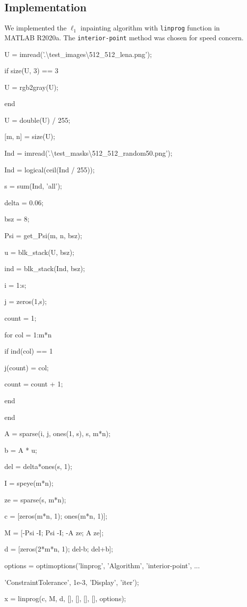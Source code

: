 \documentclass[]{article}
\newenvironment{Shaded}{}{}
\newcommand{\CommentTok}[1]{\textcolor[rgb]{0.38,0.63,0.69}{\textit{#1}}}
\newcommand{\FloatTok}[1]{\textcolor[rgb]{0.25,0.63,0.44}{#1}}
\newcommand{\NormalTok}[1]{#1}
\newcommand{\StringTok}[1]{\textcolor[rgb]{0.25,0.44,0.63}{#1}}
\begin{document}
\hypertarget{header-n19}{%
\subsection{Implementation}\label{header-n19}}

We implemented the \(\ell_1\) inpainting algorithm with \texttt{linprog}
function in MATLAB R2020a. The \texttt{interior-point} method was chosen
for speed concern.

\begin{Shaded}
\begin{Highlighting}[]
\CommentTok{% parameters, preprocesses of image and mask
}
\NormalTok{U       = imread(}\StringTok{'.\textbackslash{}test_images\textbackslash{}512_512_lena.png'}\NormalTok{);
}
\NormalTok{if size(U, }\FloatTok{3}\NormalTok{) == }\FloatTok{3}

\NormalTok{    U 	= rgb2gray(U);
}
\NormalTok{end
}
\NormalTok{U       = double(U) / }\FloatTok{255}\NormalTok{;
}
\NormalTok{[m, n]  = size(U);
}


\NormalTok{Ind     = imread(}\StringTok{'.\textbackslash{}test_masks\textbackslash{}512_512_random50.png'}\NormalTok{);
}
\NormalTok{Ind     = logical(ceil(Ind / }\FloatTok{255}\NormalTok{));
}
\NormalTok{s       = sum(Ind, }\StringTok{'all'}\NormalTok{);
}
\NormalTok{delta   = }\FloatTok{0.06}\NormalTok{;
}


\NormalTok{bsz = }\FloatTok{8}\NormalTok{;
}
\NormalTok{Psi = get_Psi(m, n, bsz);
}


\CommentTok{% block-stack U and Ind in Psi style
}
\NormalTok{u   = blk_stack(U, bsz);
}
\NormalTok{ind = blk_stack(Ind, bsz);
}


\CommentTok{% form A and b
}
\NormalTok{i       = }\FloatTok{1}\NormalTok{:s;
}
\NormalTok{j       = zeros(}\FloatTok{1}\NormalTok{,s);
}
\NormalTok{count   = }\FloatTok{1}\NormalTok{;
}
\NormalTok{for col = }\FloatTok{1}\NormalTok{:m*n
}
\NormalTok{    if ind(col) == }\FloatTok{1}

\NormalTok{        j(count) = col;
}
\NormalTok{        count = count + }\FloatTok{1}\NormalTok{;
}
\NormalTok{    end
}
\NormalTok{end
}
\NormalTok{A = sparse(i, j, ones(}\FloatTok{1}\NormalTok{, s), s, m*n);
}
\NormalTok{b = A * u;
}


\CommentTok{% linprog
}
\CommentTok{% min(c'x) s.t. Mx <= d
}
\NormalTok{del     = delta*ones(s, }\FloatTok{1}\NormalTok{);
}
\NormalTok{I       = speye(m*n);
}
\NormalTok{ze      = sparse(s, m*n);
}
\NormalTok{c       = [zeros(m*n, }\FloatTok{1}\NormalTok{); ones(m*n, }\FloatTok{1}\NormalTok{)];
}
\NormalTok{M       = [-Psi -I; Psi -I; -A ze; A ze];
}
\NormalTok{d       = [zeros(}\FloatTok{2}\NormalTok{*m*n, }\FloatTok{1}\NormalTok{); del-b; del+b];
}
\NormalTok{options = optimoptions(}\StringTok{'linprog'}\NormalTok{, }\StringTok{'Algorithm'}\NormalTok{, }\StringTok{'interior-point'}\NormalTok{, ...
}
                       \StringTok{'ConstraintTolerance'}\NormalTok{, }\FloatTok{1e-3}\NormalTok{, }\StringTok{'Display'}\NormalTok{, }\StringTok{'iter'}\NormalTok{);
}
\NormalTok{x       = linprog(c, M, d, [], [], [], [], options);
}



\end{Highlighting}
\end{Shaded}
\end{document}
